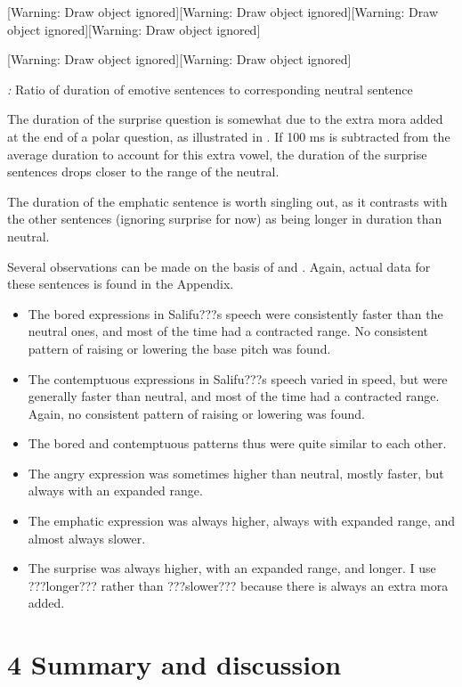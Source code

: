 \documentclass[output=paper]{langsci/langscibook}
\begin{document}
[Warning: Draw object ignored][Warning: Draw object ignored][Warning: Draw object ignored][Warning: Draw object ignored]

[Warning: Draw object ignored][Warning: Draw object ignored]

\emph{\textup{:}} Ratio of duration of emotive sentences to corresponding neutral sentence

The duration of the surprise question is somewhat due to the extra mora added at the end of a polar question, as illustrated in . If 100 ms is subtracted from the average duration to account for this extra vowel, the duration of the surprise sentences drops closer to the range of the neutral. 

The duration of the emphatic sentence is worth singling out, as it contrasts with the other sentences (ignoring surprise for now) as being longer in duration than neutral. 

Several observations can be made on the basis of  and . Again, actual data for these sentences is found in the Appendix.

\begin{itemize}
\item The bored expressions in Salifu???s speech were consistently faster than the neutral ones, and most of the time had a contracted range. No consistent pattern of raising or lowering the base pitch was found.
\item The contemptuous expressions in Salifu???s speech varied in speed, but were generally faster than neutral, and most of the time had a contracted range. Again, no consistent pattern of raising or lowering was found.
\item The bored and contemptuous patterns thus were quite similar to each other.
\item The angry expression was sometimes higher than neutral, mostly faster, but always with an expanded range.
\item The emphatic expression was always higher, always with expanded range, and almost always slower.
\item The surprise was always higher, with an expanded range, and longer. I use ???longer??? rather than ???slower??? because there is always an extra mora added.
\end{itemize}
\section{4 Summary and discussion}
\end{document}
